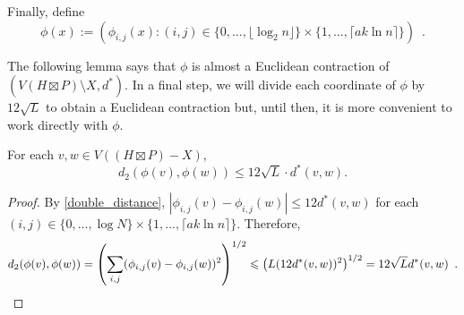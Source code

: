 \documentclass{patmorin}
\renewcommand{\le}{\leqslant}
\newcommand{\pat}[1]{\textcolor{Maroon}{Pat: #1}}
\begin{document}
Finally, define
\[
   \phi(x) := \left(\phi_{i,j}(x):(i,j)\in \{0,\ldots,\lfloor \log_2 n\rfloor\}\times\{1,\ldots,\lceil a k\ln n\rceil\}\right) \enspace .
\]


The following lemma says that $\phi$ is almost a Euclidean contraction of $(V(H\boxtimes P)\setminus X,d^*)$.  In a final step, we will divide each coordinate of $\phi$ by $12\sqrt{L}$ to obtain a Euclidean contraction but, until then, it is more convenient to work directly with $\phi$.

\begin{lem}\label{euclidean_contraction}
  For each $v,w\in V((H\boxtimes P)-X)$, $$d_2(\phi(v),\phi(w)) \le 12\sqrt{L}\cdot d^*(v,w).$$
\end{lem}

\begin{proof}
  By \cref{double_distance}, $|\phi_{i,j}(v)-\phi_{i,j}(w)|\le 12d^*(v,w)$ for each $(i,j)\in\{0,\ldots,\log N\}\times\{1,\ldots,\lceil ak\ln n\rceil\}$.  Therefore,
  \[
    d_2(\phi(v),\phi(w)) = \left(\sum_{i,j}(\phi_{i,j}(v)-\phi_{i,j}(w))^2\right)^{1/2}
    \le \left(L (12d^*(v,w))^2\right)^{1/2} = 12\sqrt{L}d^*(v,w) \enspace . \qedhere
  \]
\end{proof}



\end{document}
